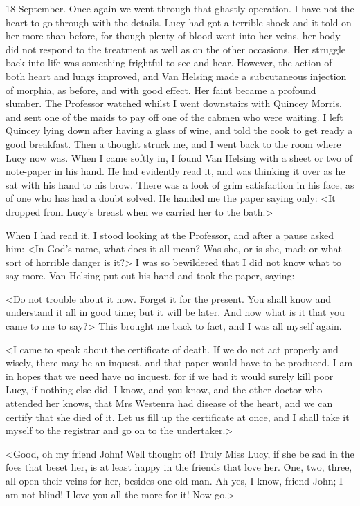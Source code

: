 \begin{diary}{18 September.}
Once again we went through that ghastly operation. I have not the heart to go through with the details. Lucy had got a terrible shock and it told on her more than before, for though plenty of blood went into her veins, her body did not respond to the treatment as well as on the other occasions. Her struggle back into life was something frightful to see and hear. However, the action of both heart and lungs improved, and Van Helsing made a subcutaneous injection of morphia, as before, and with good effect. Her faint became a profound slumber. The Professor watched whilst I went downstairs with Quincey Morris, and sent one of the maids to pay off one of the cabmen who were waiting. I left Quincey lying down after having a glass of wine, and told the cook to get ready a good breakfast. Then a thought struck me, and I went back to the room where Lucy now was. When I came softly in, I found Van Helsing with a sheet or two of note-paper in his hand. He had evidently read it, and was thinking it over as he sat with his hand to his brow. There was a look of grim satisfaction in his face, as of one who has had a doubt solved. He handed me the paper saying only: <It dropped from Lucy's breast when we carried her to the bath.>

When I had read it, I stood looking at the Professor, and after a pause asked him: <In God's name, what does it all mean? Was she, or is she, mad; or what sort of horrible danger is it?> I was so bewildered that I did not know what to say more. Van Helsing put out his hand and took the paper, saying:—

<Do not trouble about it now. Forget it for the present. You shall know and understand it all in good time; but it will be later. And now what is it that you came to me to say?> This brought me back to fact, and I was all myself again.

<I came to speak about the certificate of death. If we do not act properly and wisely, there may be an inquest, and that paper would have to be produced. I am in hopes that we need have no inquest, for if we had it would surely kill poor Lucy, if nothing else did. I know, and you know, and the other doctor who attended her knows, that Mrs Westenra had disease of the heart, and we can certify that she died of it. Let us fill up the certificate at once, and I shall take it myself to the registrar and go on to the undertaker.>

<Good, oh my friend John! Well thought of! Truly Miss Lucy, if she be sad in the foes that beset her, is at least happy in the friends that love her. One, two, three, all open their veins for her, besides one old man. Ah yes, I know, friend John; I am not blind! I love you all the more for it! Now go.>


\end{diary}
